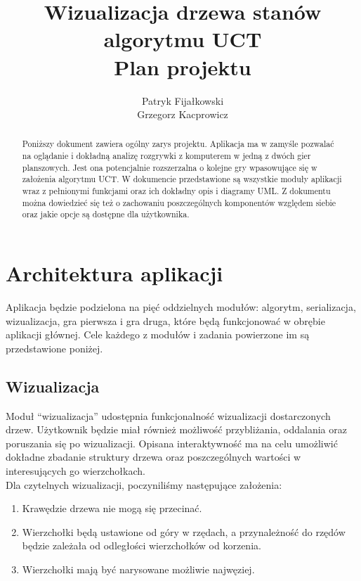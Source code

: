 \documentclass{article}
\title{
	Wizualizacja drzewa stanów algorytmu UCT \\
	\large Plan projektu}
\author{Patryk Fijałkowski \\ Grzegorz Kacprowicz}
\let\oldsection\section
\renewcommand\section{\clearpage\oldsection}
\begin{document}
	\begin{titlingpage}
		\maketitle
		\vspace{3cm}
		\begin{abstract}
			Poniższy dokument zawiera ogólny zarys projektu. Aplikacja ma w zamyśle pozwalać na oglądanie i dokładną analizę rozgrywki z komputerem w jedną z dwóch gier planszowych. Jest ona potencjalnie rozszerzalna o kolejne gry wpasowujące się w założenia algorytmu UCT. W dokumencie przedstawione są wszystkie moduły aplikacji wraz z pełnionymi funkcjami oraz ich dokładny opis i diagramy UML. Z dokumentu można dowiedzieć się też o zachowaniu poszczególnych komponentów względem siebie oraz jakie opcje są dostępne dla użytkownika. 
		\end{abstract}
	\end{titlingpage}

	\begin{versionhistory}
	\end{versionhistory}
	\tableofcontents
	
	\section{Architektura aplikacji}
	Aplikacja będzie podzielona na pięć oddzielnych modułów: algorytm, serializacja, wizualizacja, gra pierwsza i gra druga, które będą funkcjonować w obrębie aplikacji głównej. Cele każdego z modułów i zadania powierzone im są przedstawione poniżej.
	
	\subsection{Wizualizacja}
	Moduł ``wizualizacja'' udostępnia funkcjonalność wizualizacji dostarczonych drzew. Użytkownik będzie miał również możliwość przybliżania, oddalania oraz poruszania się po wizualizacji. Opisana interaktywność ma na celu umożliwić dokładne zbadanie struktury drzewa oraz poszczególnych wartości w interesujących go wierzchołkach. \\
	
	\noindent Dla czytelnych wizualizacji, poczyniliśmy następujące założenia: \\
	
	\begin{enumerate}
		\item Krawędzie drzewa nie mogą się przecinać.
		\item Wierzchołki będą ustawione od góry w rzędach, a przynależność do
		rzędów będzie zależała od odległości wierzchołków od korzenia.
		\item Wierzchołki mają być narysowane możliwie najwęziej.  \\
	\end{enumerate}
\end{document}
